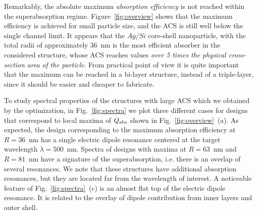 \documentclass[aps,prl,twocolumn,showpacs,superscriptaddress,groupedaddress]{revtex4-1}
\begin{document}
Remarkably, the absolute maximum {\em absorption efficiency} is not
reached within the superabsorption regime. Figure~\ref{fig:overview}
shows that the maximum efficiency is achieved for small particle size,
and the ACS is still well below the single channel limit. It appears
that the $Ag/Si$ core-shell nanoparticle, with the total radii of
approximately 36~nm is the most efficient absorber in the considered
structure, whose ACS reaches values {\em over 5 times the physical
  cross-section area of the particle}.  From practical point of view
it is quite important that the maximum can be reached in a bi-layer
structure, instead of a triple-layer, since it should be easier and
cheaper to fabricate.

\begin{figure}
\end{figure}
To study spectral properties of the structures with large ACS which we
obtained by the optimization, in Fig.~\ref{fig:spectra} we plot three
different cases for designs that correspond to local maxima of $Q_{\rm
  abs}$ shown in Fig.~\ref{fig:overview}~(a).  As expected, the design
corresponding to the maximum absorption efficiency at $R=36$~nm has a
single electric dipole resonance centered at the target wavelength
$\lambda=500$~nm. Spectra of designs with maxima at $R=63$~nm and
$R=81$~nm have a signature of the superabsorption, i.e. there is an
overlap of several resonances.  We note that these structures have
additional absorption resonances, but they are located far from the
wavelength of interest.  A noticeable feature of
Fig.~\ref{fig:spectra}~(c) is an almost flat top of the electric
dipole resonance.  It is related to the overlay of dipole contribution
from inner layers and outer shell.
\end{document}
